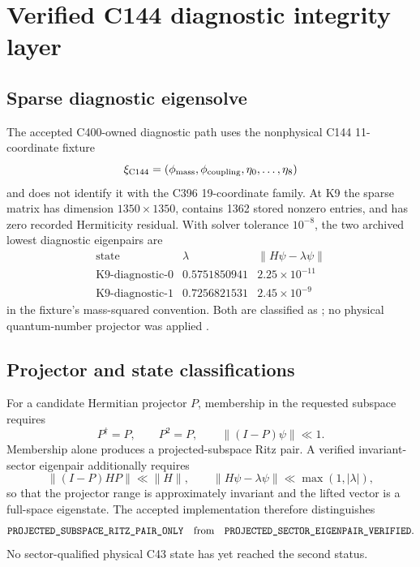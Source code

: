 \documentclass[11pt,oneside]{book}
\newcommand{\statuscode}[1]{\text{\ttfamily\detokenize{#1}}}
\begin{document}
\section{Verified C144 diagnostic integrity layer}
\label{sec:c144-diagnostic}

\subsection{Sparse diagnostic eigensolve}

The accepted C400-owned diagnostic path uses the nonphysical C144 11-coordinate fixture
\begin{equation}
 \xi_{\rm C144}
 =\left(\phi_{\rm mass},\phi_{\rm coupling},\eta_0,\ldots,\eta_8\right)
 \label{eq:c144-coordinate-vector}
\end{equation}
and does not identify it with the C396 19-coordinate family.  At K9 the sparse matrix has dimension $1350\times1350$, contains 1362 stored nonzero entries, and has zero recorded Hermiticity residual.  With solver tolerance $10^{-8}$, the two archived lowest diagnostic eigenpairs are
\begin{equation}
 \begin{array}{c|cc}
 \text{state}&\lambda&\|H\psi-\lambda\psi\|\\\hline
 \text{K9-diagnostic-0}&0.5751850941&2.25\times10^{-11}\\
 \text{K9-diagnostic-1}&0.7256821531&2.45\times10^{-9}
 \end{array}
 \label{eq:c144-diagnostic-eigenpairs}
\end{equation}
in the fixture's mass-squared convention.  Both are classified as \statuscode{UNPROJECTED_DIAGNOSTIC_EIGENPAIR}; no physical quantum-number projector was applied \cite{DWC400S2Record2026}.

\subsection{Projector and state classifications}

For a candidate Hermitian projector $P$, membership in the requested subspace requires
\begin{equation}
 P^\dagger=P,
 \qquad P^2=P,
 \qquad \|(I-P)\psi\|\ll1.
 \label{eq:projector-membership}
\end{equation}
Membership alone produces a projected-subspace Ritz pair.  A verified invariant-sector eigenpair additionally requires
\begin{equation}
 \|(I-P)HP\|\ll\|H\|,
 \qquad
 \|H\psi-\lambda\psi\|\ll\max(1,|\lambda|),
 \label{eq:projector-invariance-and-full-residual}
\end{equation}
so that the projector range is approximately invariant and the lifted vector is a full-space eigenstate.  The accepted implementation therefore distinguishes
\begin{equation}
 \statuscode{PROJECTED_SUBSPACE_RITZ_PAIR_ONLY}
 \quad\text{from}\quad
 \statuscode{PROJECTED_SECTOR_EIGENPAIR_VERIFIED}.
 \label{eq:projected-state-statuses}
\end{equation}
No sector-qualified physical C43 state has yet reached the second status.
\end{document}
